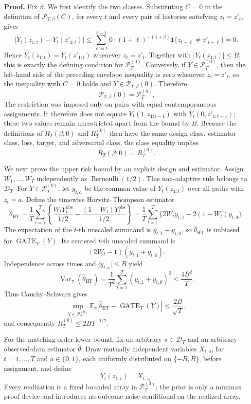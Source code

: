 \textbf{Proof.} Fix \(\beta\). We first identify the two classes. Substituting \(C=0\) in the definition of \(\mathcal P_{T,\beta}(C)\), for every \(t\) and every pair of histories satisfying \(z_t=z'_t\), gives
\[
\left|Y_t(z_{1:t})-Y_t(z'_{1:t})\right|
\le
\sum_{\ell=1}^{t-1}0\cdot(1+\ell)^{-(1+\beta)}\mathbf 1\{z_{t-\ell}\ne z'_{t-\ell}\}=0.
\]
Hence \(Y_t(z_{1:t})=Y_t(z'_{1:t})\) whenever \(z_t=z'_t\). Together with \(\lvert Y_t(z_{1:t})\rvert\le B\), this is exactly the defining condition for \(\mathcal P_T^{(0)}\). Conversely, if \(Y\in\mathcal P_T^{(0)}\), then the left-hand side of the preceding envelope inequality is zero whenever \(z_t=z'_t\), so the inequality with \(C=0\) holds and \(Y\in\mathcal P_{T,\beta}(0)\). Therefore
\[
\mathcal P_{T,\beta}(0)=\mathcal P_T^{(0)}.
\]
The restriction was imposed only on pairs with equal contemporaneous assignments. It therefore does not equate \(Y_t(1,z_{1:t-1})\) with \(Y_t(0,z'_{1:t-1})\); these two values remain unrestricted apart from the bound by \(B\). Because the definitions of \(R_T(\beta;0)\) and \(R_T^{(0)}\) then have the same design class, estimator class, loss, target, and adversarial class, the class equality implies
\[
R_T(\beta;0)=R_T^{(0)}.
\]

We next prove the upper risk bound by an explicit design and estimator. Assign \(W_1,\ldots,W_T\) independently as \(\operatorname{Bernoulli}(1/2)\). This non-adaptive rule belongs to \(\mathcal D_T\). For \(Y\in\mathcal P_T^{(0)}\), let \(y_{t,a}\) be the common value of \(Y_t(z_{1:t})\) over all paths with \(z_t=a\). Define the timewise Horvitz--Thompson estimator
\[
\widehat\theta_{\mathrm{HT}}
=\frac1T\sum_{t=1}^T
\left\{
\frac{W_tY_t^{\mathrm{obs}}}{1/2}
-\frac{(1-W_t)Y_t^{\mathrm{obs}}}{1/2}
\right\}
=\frac1T\sum_{t=1}^T
\{2W_ty_{t,1}-2(1-W_t)y_{t,0}\}.
\]
The expectation of the \(t\)-th unscaled summand is \(y_{t,1}-y_{t,0}\), so \(\widehat\theta_{\mathrm{HT}}\) is unbiased for \(\operatorname{GATE}_T(Y)\). Its centered \(t\)-th unscaled summand is
\[
(2W_t-1)(y_{t,1}+y_{t,0}).
\]
Independence across times and \(\lvert y_{t,a}\rvert\le B\) yield
\[
\operatorname{Var}_\pi(\widehat\theta_{\mathrm{HT}})
=\frac1{T^2}\sum_{t=1}^T(y_{t,1}+y_{t,0})^2
\le\frac{4B^2}{T}.
\]
Thus Cauchy--Schwarz gives
\[
\sup_{Y\in\mathcal P_T^{(0)}}
\mathbb E_\pi\left|\widehat\theta_{\mathrm{HT}}-\operatorname{GATE}_T(Y)\right|
\le\frac{2B}{\sqrt T},
\]
and consequently \(R_T^{(0)}\le 2B T^{-1/2}\).

For the matching-order lower bound, fix an arbitrary \(\pi\in\mathcal D_T\) and an arbitrary observed-data estimator \(\widehat\theta\). Draw mutually independent variables \(X_{t,a}\), for \(t=1,\ldots,T\) and \(a\in\{0,1\}\), each uniformly distributed on \(\{-B,B\}\), before assignment, and define
\[
Y_t(z_{1:t})=X_{t,z_t}.
\]
Every realization is a fixed bounded array in \(\mathcal P_T^{(0)}\); the prior is only a minimax proof device and introduces no outcome noise conditional on the realized array.

